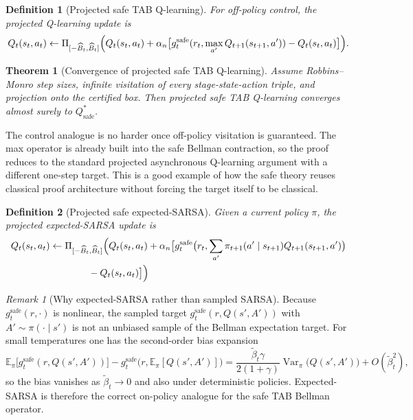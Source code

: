 \documentclass{article}
\newtheorem{theorem}{Theorem}[section]
\newtheorem{definition}[definition]{Definition}
\theoremstyle{remark}
\newtheorem{remark}[remark]{Remark}
\DeclareMathOperator{\Var}{Var}
\newcommand{\E}{\mathbb{E}}
\newcommand{\safe}{\mathrm{safe}}
\newcommand{\Bhat}{\widehat B}
\begin{document}
\begin{definition}[Projected safe TAB Q-learning]
\label{def:lse-q}
For off-policy control, the projected Q-learning update is
\begin{equation}
Q_t(s_t,a_t)
\leftarrow
\Pi_{[-\Bhat_t,\Bhat_t]}
\Bigl(Q_t(s_t,a_t) + \alpha_n\bigl[g_t^{\safe}(r_t,\max_{a'}Q_{t+1}(s_{t+1},a')) - Q_t(s_t,a_t)\bigr]\Bigr).
\label{eq:safe-q-update}
\end{equation}
\end{definition}

\begin{theorem}[Convergence of projected safe TAB Q-learning]
\label{thm:q-convergence}
Assume Robbins--Monro step sizes, infinite visitation of every stage-state-action triple, and projection onto the certified box.
Then projected safe TAB Q-learning converges almost surely to $Q_\safe^*$.
\end{theorem}

The control analogue is no harder once off-policy visitation is guaranteed.
The max operator is already built into the safe Bellman contraction, so the proof reduces to the standard projected asynchronous Q-learning argument with a different one-step target.
This is a good example of how the safe theory reuses classical proof architecture without forcing the target itself to be classical.


\begin{definition}[Projected safe expected-SARSA]
\label{def:lse-sarsa}
Given a current policy $\pi$, the projected expected-SARSA update is
\begin{equation}
\begin{aligned}
Q_t(s_t,a_t)
&\leftarrow
\Pi_{[-\Bhat_t,\Bhat_t]}
\Bigl(
Q_t(s_t,a_t) + \alpha_n\bigl[
    g_t^{\safe}\bigl(r_t,\sum_{a'}\pi_{t+1}(a'\mid s_{t+1})Q_{t+1}(s_{t+1},a')\bigr) \\
&\qquad\qquad
    - Q_t(s_t,a_t)
\bigr]
\Bigr)
\end{aligned}
\label{eq:safe-sarsa}
\end{equation}
\end{definition}

\begin{remark}[Why expected-SARSA rather than sampled SARSA]
\label{rem:expected-sarsa}
Because $g_t^{\safe}(r,\cdot)$ is nonlinear, the sampled target $g_t^{\safe}(r,Q(s',A'))$ with $A'\sim\pi(\cdot\mid s')$ is not an unbiased sample of the Bellman expectation target.
For small temperatures one has the second-order bias expansion
\begin{equation}
\E_\pi\bigl[g_t^{\safe}(r,Q(s',A'))\bigr] - g_t^{\safe}\bigl(r,\E_\pi[Q(s',A')]\bigr)
=
\frac{\widetilde\beta_t\gamma}{2(1+\gamma)}\Var_\pi\!\bigl(Q(s',A')\bigr) + O(\widetilde\beta_t^2),
\label{eq:sarsa-bias}
\end{equation}
so the bias vanishes as $\widetilde\beta_t\to 0$ and also under deterministic policies.
Expected-SARSA is therefore the correct on-policy analogue for the safe TAB Bellman operator.
\end{remark}
\end{document}
